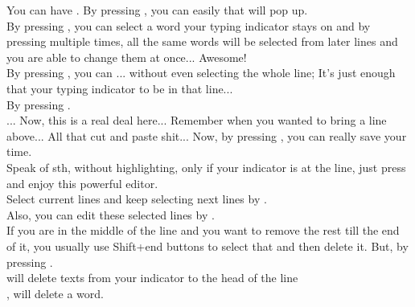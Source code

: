 \documentclass[a4paper,18pt]{article}
\begin{document}
You can have {\textbf{\color{Red}{multiple .py files opened in different tabs}}}. By pressing {\textbf{\color{Red}{Ctrl+P}}}, you can easily {\textbf{\color{Red}{navigate through them from the pane}}} that will pop up.\\

By pressing {\textbf{\color{Red}{Ctrl+D}}}, you can select a word your typing indicator stays on and by pressing {\textbf{\color{Red}{Ctrl+D}}} multiple times, all the same words will be selected from later lines and you are able to change them at once... Awesome!\\

By pressing {\textbf{\color{Red}{Ctrl+Shift+D}}}, you can {\textbf{\color{Red}{copy a line}}}... without even selecting the whole line; It's just enough that your typing indicator to be in that line...\\

By pressing {\textbf{\color{Red}{Ctrl+/, you can comment the lines}}}.\\

{\textbf{\color{Red}{Moving a code line up or down}}}... Now, this is a real deal here... Remember when you wanted to bring a line above... All that cut and paste shit... Now, by pressing {\textbf{\color{Red}{Ctrl+Shift+up/down}}}, you can really save your time.\\

Speak of {\textbf{\color{Red}{cutting}}} sth, without highlighting, only if your indicator is at the line, just press {\textbf{\color{Red}{Ctrl+X}}} and enjoy this powerful editor.\\

Select current lines and keep selecting next lines by {\textbf{\color{Red}{Ctrl+L}}}.\\
Also, you can edit these selected lines by {\textbf{\color{Red}{Ctrl+Shift+L}}}.\\

If you are in the middle of the line and you want to remove the rest till the end of it, you usually use Shift+end buttons to select that and then delete it. But, by pressing {\textbf{\color{Red}{Ctrl+Shift+delete, it will remove the rest of the line}}}.\\ 
{\textbf{\color{Red}{Ctrl+Shift+Backspace}}} will delete texts from your indicator to the head of the line\\

{\textbf{\color{Red}{Ctrl+Backspace}}}, will delete a word.\\
\end{document}
